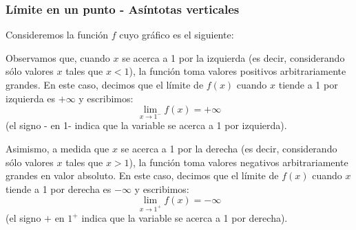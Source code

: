 \documentclass[../Teoría.root.tex]{subfiles}
\begin{document}
\subsubsection{Límite en un punto - Asíntotas verticales}
Consideremos la función \(f\) cuyo gráfico es el siguiente:
\begin{center}
\end{center}
Observamos que, cuando \(x\) se acerca a 1 por la izquierda (es decir, considerando sólo valores \(x\) tales que \(x<1\)), la función toma valores positivos arbitrariamente grandes.
En este caso, decimos que el límite de \(f(x)\) cuando \(x\) tiende a 1 por izquierda es \(+\infty\) y escribimos:
\[\lim_{x\to1^-}f(x)=+\infty\]
(el signo - en 1- indica que la variable se acerca a 1 por izquierda).

Asimismo, a medida que \(x\) se acerca a 1 por la derecha (es decir, considerando sólo valores \(x\) tales que \(x>1\)), la función toma valores negativos arbitrariamente grandes en valor absoluto.
En este caso, decimos que el límite de \(f(x)\) cuando \(x\) tiende a 1 por derecha es \(-\infty\) y escribimos:
\[\lim_{x\to1^+}f(x)=-\infty\]
(el signo \(+\) en \(1^+\) indica que la variable se acerca a 1 por derecha).
\end{document}
